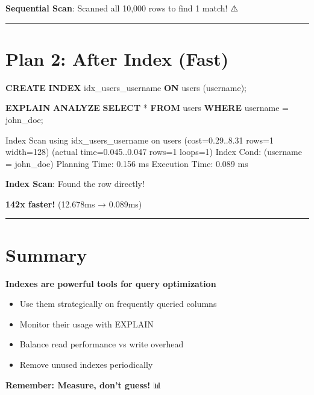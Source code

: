 \documentclass[
]{report}
\newenvironment{Shaded}{\begin{snugshade}}{\end{snugshade}}
\newcommand{\KeywordTok}[1]{\textcolor[rgb]{0.00,0.23,0.31}{\textbf{#1}}}
\newcommand{\NormalTok}[1]{\textcolor[rgb]{0.00,0.23,0.31}{#1}}
\newcommand{\OperatorTok}[1]{\textcolor[rgb]{0.37,0.37,0.37}{#1}}
\newcommand{\StringTok}[1]{\textcolor[rgb]{0.13,0.47,0.30}{#1}}
\providecommand{\tightlist}{%
  \setlength{\itemsep}{0pt}\setlength{\parskip}{0pt}}\usepackage{longtable,booktabs,array}
\begin{document}
\textbf{Sequential Scan}: Scanned all 10,000 rows to find 1 match! ⚠️

\begin{center}\rule{0.5\linewidth}{0.5pt}\end{center}

\section{Plan 2: After Index (Fast)}\label{plan-2-after-index-fast}

\begin{Shaded}
\begin{Highlighting}[]
\KeywordTok{CREATE} \KeywordTok{INDEX}\NormalTok{ idx\_users\_username }\KeywordTok{ON}\NormalTok{ users (username);}

\KeywordTok{EXPLAIN} \KeywordTok{ANALYZE}
\KeywordTok{SELECT} \OperatorTok{*} \KeywordTok{FROM}\NormalTok{ users }\KeywordTok{WHERE}\NormalTok{ username }\OperatorTok{=} \StringTok{\textquotesingle{}john\_doe\textquotesingle{}}\NormalTok{;}
\end{Highlighting}
\end{Shaded}

\begin{Shaded}
\begin{Highlighting}[]
\NormalTok{Index Scan using idx\_users\_username on users  }
\NormalTok{  (cost=0.29..8.31 rows=1 width=128) }
\NormalTok{  (actual time=0.045..0.047 rows=1 loops=1)}
\NormalTok{  Index Cond: (username = \textquotesingle{}john\_doe\textquotesingle{})}
\NormalTok{Planning Time: 0.156 ms}
\NormalTok{Execution Time: 0.089 ms}
\end{Highlighting}
\end{Shaded}

\textbf{Index Scan}: Found the row directly! 🚀

\textbf{142x faster!} (12.678ms → 0.089ms)

\begin{center}\rule{0.5\linewidth}{0.5pt}\end{center}

\section{Summary}\label{summary}

\textbf{Indexes are powerful tools for query optimization}

\begin{itemize}
\tightlist
\item
  Use them strategically on frequently queried columns
\item
  Monitor their usage with EXPLAIN
\item
  Balance read performance vs write overhead
\item
  Remove unused indexes periodically
\end{itemize}

\textbf{Remember: Measure, don't guess!} 📊
\end{document}
